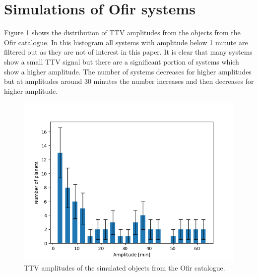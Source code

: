 \documentclass[12pt]{report}
\begin{document}
\section{Simulations of Ofir systems}
	Figure \ref{fig:ampl_ofir} shows the distribution of TTV amplitudes from the objects from the Ofir catalogue. In this histogram all systems with amplitude below 1 minute are filtered out as they are not of interest in this paper. It is clear that many systems show a small TTV signal but there are a significant portion of systems which show a higher amplitude. The number of systems decreases for higher amplitudes but at amplitudes around 30 minutes the number increases and then decreases for higher amplitude.
\begin{figure}
 	 \centering
	  \includegraphics[width=\textwidth]{img/ampl_ofir_66.png}
	  \caption{TTV amplitudes of the simulated objects from the Ofir catalogue.}
	 \label{fig:ampl_ofir}
\end{figure}
\end{document}
